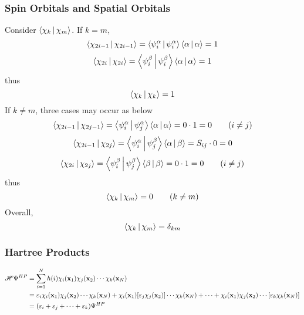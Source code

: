 \documentclass[a4paper]{article}
\begin{document}
\subsubsection{Spin Orbitals and Spatial Orbitals}
Consider $ \Braket{\chi_k | \chi_m} $. If $ k=m $,
\begin{equation}\label{key}
\Braket{\chi_{2i-1} | \chi_{2i-1}} = \Braket{\psi_i^\alpha | \psi_i^\alpha} \Braket{\alpha|\alpha} = 1
\end{equation}
\begin{equation}\label{key}
\Braket{\chi_{2i} | \chi_{2i}} = \Braket{\psi_i^\beta | \psi_i^\beta} \Braket{\alpha|\alpha} = 1
\end{equation}
thus
\begin{equation}\label{key}
\Braket{\chi_k | \chi_k} = 1
\end{equation}
If $ k\neq m $, three cases may occur as below
\begin{equation}\label{key}
\Braket{\chi_{2i-1} | \chi_{2j-1}} = \Braket{\psi_i^\alpha | \psi_j^\alpha}\Braket{\alpha|\alpha} = 0\cdot 1 = 0 \qquad (i\neq j)
\end{equation}
\begin{equation}
\Braket{\chi_{2i-1} | \chi_{2j}} = \Braket{\psi_i^\alpha | \psi_j^\beta}\Braket{\alpha|\beta} = S_{ij}\cdot 0 = 0
\end{equation}
\begin{equation}\label{key}
\Braket{\chi_{2i} | \chi_{2j}} = \Braket{\psi_i^\beta | \psi_j^\beta}\Braket{\beta|\beta} = 0\cdot 1 = 0 \qquad (i\neq j)
\end{equation}
thus
\begin{equation}\label{key}
\Braket{\chi_k | \chi_m} = 0 \qquad (k\neq m)
\end{equation}
Overall,
\begin{equation}\label{key}
\Braket{\chi_k | \chi_m} = \delta_{km}
\end{equation}

\subsubsection{Hartree Products}
\begin{equation}\label{key}
\begin{aligned}
\mathscr{H}\Psi^{HP} &= \sum_{i=1}^N h(i)\chi_i(\vb{x}_1)\chi_j(\vb{x}_2)\cdots\chi_k(\vb{x}_N)\\
&= \varepsilon_i\chi_i(\vb{x}_1)\chi_j(\vb{x}_2)\cdots\chi_k(\vb{x}_N) + \chi_i(\vb{x}_1)[\varepsilon_j\chi_j(\vb{x}_2)]\cdots\chi_k(\vb{x}_N) + \cdots + \chi_i(\vb{x}_1)\chi_j(\vb{x}_2)\cdots[\varepsilon_k\chi_k(\vb{x}_N)]\\
&= (\varepsilon_i +\varepsilon_j + \cdots + \varepsilon_k)\Psi^{HP}
\end{aligned}
\end{equation}
\end{document}

